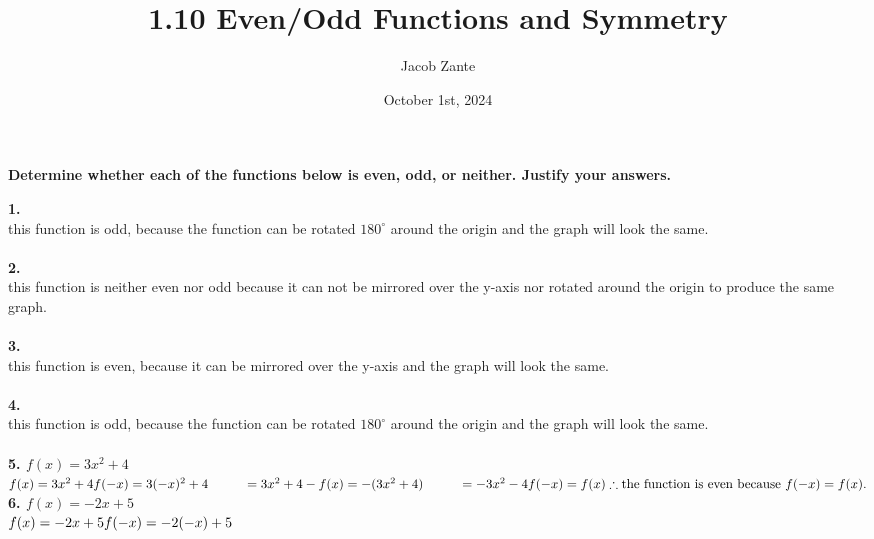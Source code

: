 \documentclass[14pt, a4paper]{extarticle}
\title{1.10 Even/Odd Functions and Symmetry}
\author{Jacob Zante}
\date{October 1st, 2024}
\begin{document}
\maketitle
\setlength{\parindent}{0pt}

\textbf{Determine whether each of the functions below is even, odd, or neither. Justify your answers.} \\
\begin{adjustwidth}{1cm}{0pt}
    \textbf{1.} \\
    this function is odd, because the function can be rotated $180^\circ$ around 
    the origin and the graph will look the same. \\
    \\
    \textbf{2.} \\
    this function is neither even nor odd because it can not be mirrored over the y-axis 
    nor rotated around the origin to produce the same graph. \\
    \\
    \textbf{3.} \\
    this function is even, because it can be mirrored over the y-axis 
    and the graph will look the same. \\
    \\
    \textbf{4.} \\
    this function is odd, because the function can be rotated $180^\circ$ around 
    the origin and the graph will look the same. \\
    \\
    \textbf{5. $f(x) = 3x^2 + 4$} \\
    \begin{math}
        f(x) = 3x^2 + 4 \\
        f(-x) = 3(-x)^2 + 4 \\
        \phantom{f(-x) } = 3x^2 + 4 \\
        -f(x) = -(3x^2 + 4) \\
        \phantom{-f(x) } = -3x^2 - 4 \\
        f(-x) = f(x) \\
        \therefore \text{the function is even because $f(-x) = f(x)$.} \\
    \end{math}
    \\
    \textbf{6. $f(x) = -2x + 5$} \\
    \begin{math}
        f(x) = -2x + 5 \\
        f(-x) = -2(-x) + 5 \\

\end{math}
\end{adjustwidth}
\end{document}
